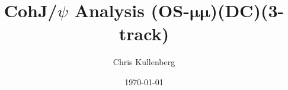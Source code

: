 \title{CohJ/$\psi$ Analysis (\textbf{OS}-$\boldsymbol{\mu\mu}$)(\textbf{DC})(\textbf{3-track})}
\author{Chris Kullenberg}
\date{\today}
